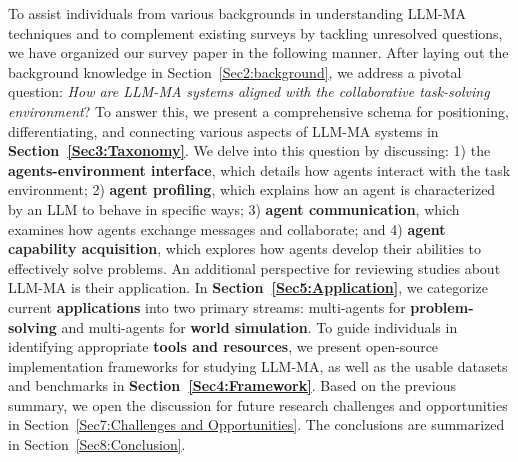To assist individuals from various backgrounds in understanding LLM-MA techniques and to complement existing surveys by tackling unresolved questions, we have organized our survey paper in the following manner. After laying out the background knowledge in Section~\ref{Sec2:background}, we address a pivotal question: \emph{How are LLM-MA systems aligned with the collaborative task-solving environment}?   To answer this, we present a comprehensive schema for positioning, differentiating, and connecting various aspects of LLM-MA systems in  \textbf{Section~\ref{Sec3:Taxonomy}}. We delve into this question by discussing: 1) the  \textbf{agents-environment interface}, which details how agents interact with the task environment; 2)  \textbf{agent profiling}, which explains how an agent is characterized by an LLM to behave in specific ways; 3)  \textbf{agent communication}, which examines how agents exchange messages and collaborate; and 4)  \textbf{agent capability acquisition}, which explores how agents develop their abilities to effectively solve problems. 
An additional perspective for reviewing studies about LLM-MA is their application. In  \textbf{Section~\ref{Sec5:Application}}, we categorize current  \textbf{applications} into two primary streams: multi-agents for \textbf{problem-solving} and multi-agents for \textbf{world simulation}.
To guide individuals in identifying appropriate \textbf{tools and resources},  we present open-source implementation frameworks for studying LLM-MA, as well as the usable datasets and benchmarks in  \textbf{Section~\ref{Sec4:Framework}}.
Based on the previous summary, we open the discussion for future research challenges and opportunities in Section~\ref{Sec7:Challenges and Opportunities}. The conclusions are summarized in Section~\ref{Sec8:Conclusion}.